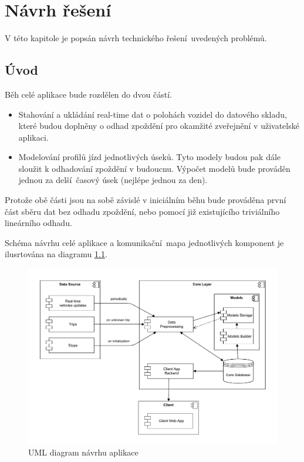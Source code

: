 
\chapter{Návrh řešení}

V této kapitole je popsán návrh technického řešení uvedených problémů.

\section{Úvod}

Běh celé aplikace bude rozdělen do dvou částí.

\begin{itemize}
	\item Stahování a ukládání real-time dat o polohách vozidel do datového skladu, které budou doplněny o odhad zpoždění pro okamžité zveřejnění v uživatelské aplikaci.

	\item Modelování profilů jízd jednotlivých úseků. Tyto modely budou pak dále sloužit k odhadování zpoždění v budoucnu. Výpočet modelů bude prováděn jednou za delší časový úsek (nejlépe jednou za den).
\end{itemize}

Protože obě části jsou na sobě závislé v iniciálním běhu bude prováděna první část sběru dat bez odhadu zpoždění, nebo pomocí již existujícího triviálního lineárního odhadu.

\bigbreak

Schéma návrhu celé aplikace a komunikační mapa jednotlivých komponent je ilusrtována na diagramu \ref{fig:design_diagram}.

\begin{figure}
	\centering
  \includegraphics[width=\linewidth]{../img/design_diagram}
  \caption{UML diagram návrhu aplikace}
  \label{fig:design_diagram}
\end{figure}

